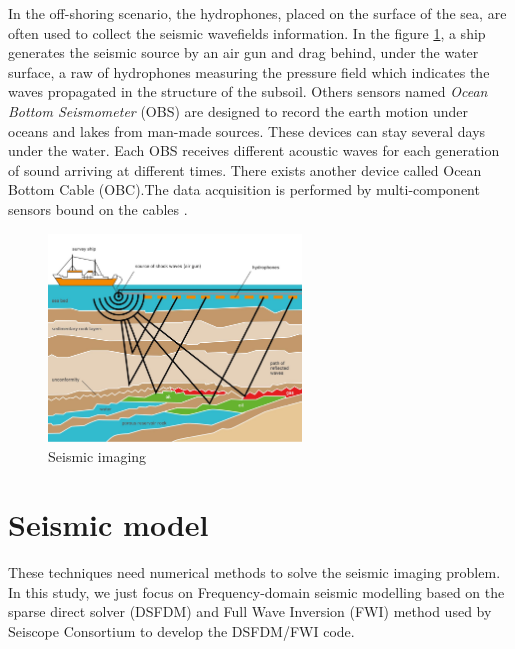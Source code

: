 In the off-shoring scenario, the hydrophones, placed on the surface of the sea, are often used to collect the seismic wavefields information. In the figure \ref{hydrophones}, a ship generates the seismic source by an air gun and drag behind, under the water surface, a raw of hydrophones measuring the pressure field which indicates the waves propagated in the structure of the subsoil. Others sensors named \textit{Ocean Bottom Seismometer} (OBS) are designed to record the earth motion under oceans and lakes from man-made sources. These devices can stay several days under the water. Each OBS receives different acoustic waves for each generation of sound arriving at different times. There exists another device called Ocean Bottom Cable (OBC).The data acquisition is performed by multi-component sensors bound on the cables \cite{BROSSIERPhD}. 
\begin{figure}[!h]
\centering 
\includegraphics[width=0.6\textwidth]{images/hydrophones.jpg}
\caption{Seismic imaging}
\label{hydrophones} 
\end{figure}


\section{Seismic model}
These techniques need numerical methods to solve the seismic imaging problem. In this study, we just focus on Frequency-domain seismic modelling based on the sparse direct solver (DSFDM) and Full Wave Inversion (FWI) method used by Seiscope Consortium to develop the DSFDM/FWI code.

